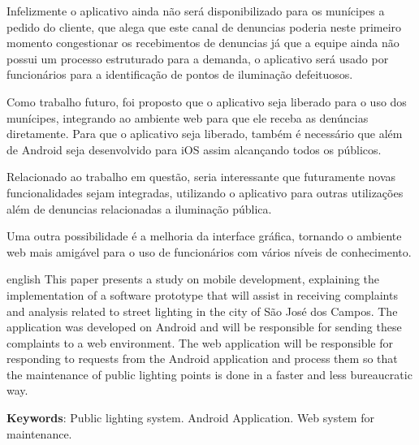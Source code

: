 \documentclass[
	article,			%
	11pt,				%
	oneside,			%
	a4paper,			%
	english,			%
	brazil,				%
	sumario=tradicional
	]{abntex2}
\begin{document}
Infelizmente o aplicativo ainda não será disponibilizado para os munícipes a
pedido do cliente, que alega que este canal de denuncias poderia  neste primeiro
momento congestionar os recebimentos de denuncias já que a equipe ainda não
possui um processo estruturado para a demanda, o aplicativo será usado por
funcionários para a identificação de pontos de iluminação defeituosos.

Como trabalho futuro, foi proposto que o aplicativo seja liberado para o uso
dos munícipes, integrando ao ambiente web para que ele receba as denúncias
diretamente. Para que o aplicativo seja liberado, também é necessário que
além de Android seja desenvolvido para iOS assim alcançando todos os públicos.

Relacionado ao trabalho em questão, seria interessante que futuramente novas
funcionalidades sejam integradas, utilizando o aplicativo para outras
utilizações além de denuncias relacionadas a iluminação pública.

Uma outra possibilidade é a melhoria da interface gráfica, tornando o ambiente
web mais amigável para o uso de funcionários com vários níveis de conhecimento.





\postextual



\emptythanks
\maketitle

\renewcommand{\resumoname}{Abstract}
\begin{resumoumacoluna}
 \begin{otherlanguage*}{english}
   This paper presents a study on mobile development, explaining the
   implementation of a software prototype that will assist in receiving
   complaints and analysis related to street lighting in the city of São José
   dos Campos. The application was developed on Android and will be responsible
   for sending these complaints to a web environment. The web application
   will be responsible for responding to requests from the Android application
   and process them so that the maintenance of public lighting points is done
   in a faster and less bureaucratic way.
   \vspace{\onelineskip}

   \noindent
   \textbf{Keywords}: Public lighting system. Android Application. Web system for maintenance.
 \end{otherlanguage*}
\end{resumoumacoluna}
\end{document}
